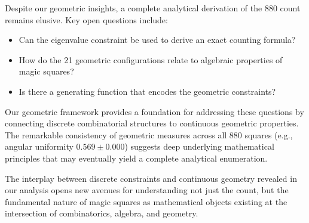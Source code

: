 Despite our geometric insights, a complete analytical derivation of the 880 count remains elusive. Key open questions include:

\begin{itemize}
    \item Can the eigenvalue constraint be used to derive an exact counting formula?
    \item How do the 21 geometric configurations relate to algebraic properties of magic squares?
    \item Is there a generating function that encodes the geometric constraints?
\end{itemize}

Our geometric framework provides a foundation for addressing these questions by connecting discrete combinatorial structures to continuous geometric properties. The remarkable consistency of geometric measures across all 880 squares (e.g., angular uniformity $0.569 \pm 0.000$) suggests deep underlying mathematical principles that may eventually yield a complete analytical enumeration.

The interplay between discrete constraints and continuous geometry revealed in our analysis opens new avenues for understanding not just the count, but the fundamental nature of magic squares as mathematical objects existing at the intersection of combinatorics, algebra, and geometry. 